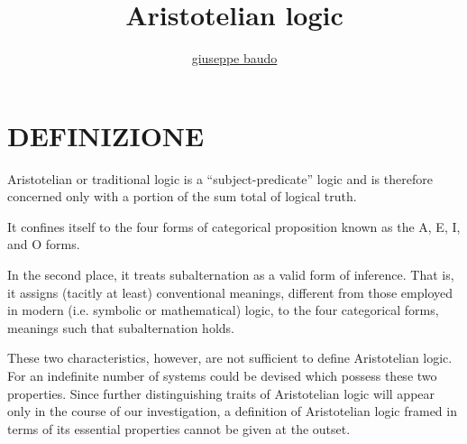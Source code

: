 \documentclass[a4paper,10pt]{article}
\title{Aristotelian logic}
\author{\href{http://www.baudo.hol.es}{giuseppe baudo}}
\begin{document}
\maketitle

\section{DEFINIZIONE}
Aristotelian or traditional logic is a “subject-predicate” logic and is therefore concerned only with a portion of the sum total of logical truth.

It confines itself to the four forms of categorical proposition 
known as the A, E, I, and O forms.

In the second place, it treats subalternation as a valid form of inference. 
That is, it assigns (tacitly at least) conventional meanings, different from those employed in modern 
(i.e. symbolic or mathematical) logic, to the four categorical forms, meanings such that subalternation holds.

These two characteristics, however, are not sufficient to define Aristotelian logic. 
For an indefinite number of systems could be devised which possess these two properties. 
Since further distinguishing traits of Aristotelian logic will appear only in the course of our investigation, 
a definition of Aristotelian logic framed in terms of its essential properties cannot be given at the outset.

\end{document}
